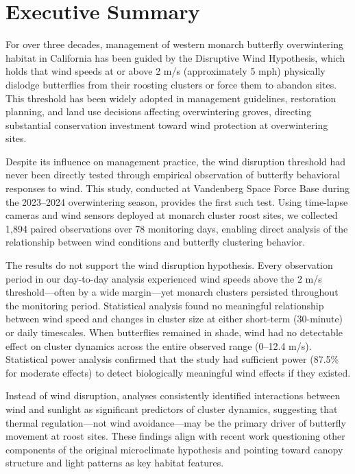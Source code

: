 \section*{Executive Summary}

For over three decades, management of western monarch butterfly overwintering habitat in California has been guided by the Disruptive Wind Hypothesis, which holds that wind speeds at or above 2 m/s (approximately 5 mph) physically dislodge butterflies from their roosting clusters or force them to abandon sites. This threshold has been widely adopted in management guidelines, restoration planning, and land use decisions affecting overwintering groves, directing substantial conservation investment toward wind protection at overwintering sites.

Despite its influence on management practice, the wind disruption threshold had never been directly tested through empirical observation of butterfly behavioral responses to wind. This study, conducted at Vandenberg Space Force Base during the 2023--2024 overwintering season, provides the first such test. Using time-lapse cameras and wind sensors deployed at monarch cluster roost sites, we collected 1,894 paired observations over 78 monitoring days, enabling direct analysis of the relationship between wind conditions and butterfly clustering behavior.

The results do not support the wind disruption hypothesis. Every observation period in our day-to-day analysis experienced wind speeds above the 2 m/s threshold---often by a wide margin---yet monarch clusters persisted throughout the monitoring period. Statistical analysis found no meaningful relationship between wind speed and changes in cluster size at either short-term (30-minute) or daily timescales. When butterflies remained in shade, wind had no detectable effect on cluster dynamics across the entire observed range (0--12.4 m/s). Statistical power analysis confirmed that the study had sufficient power (87.5\% for moderate effects) to detect biologically meaningful wind effects if they existed.

Instead of wind disruption, analyses consistently identified interactions between wind and sunlight as significant predictors of cluster dynamics, suggesting that thermal regulation---not wind avoidance---may be the primary driver of butterfly movement at roost sites. These findings align with recent work questioning other components of the original microclimate hypothesis and pointing toward canopy structure and light patterns as key habitat features.


